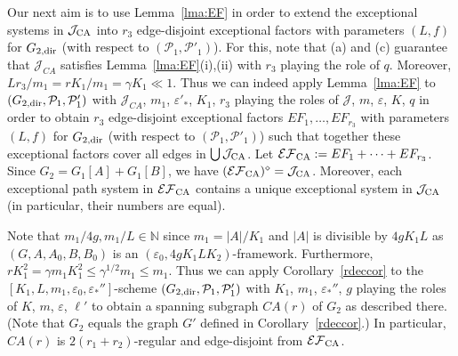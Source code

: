 \documentclass{memo-l}
\def\cP{\mathcal{P}}
\def\eps{\varepsilon}
\def\cJ{\mathcal{J}}
\def\epszero{\eps_0}
\numberwithin{section}{chapter}
\numberwithin{equation}{section}
\numberwithin{firstthm}{section}
\numberwithin{figure}{section}
\begin{document}
{Our next aim is to use Lemma~\ref{lma:EF} in order to extend the exceptional systems in $\mathcal{J}_{\rm CA}$ into $r_3$
edge-disjoint exceptional factors with parameters $(L,f)$ for $G_{2,{\rm dir}}$ (with respect to $(\cP_1,\cP'_1)$).
For this, note that (a) and (c) guarantee that $\cJ_{CA}$ satisfies Lemma~\ref{lma:EF}(i),(ii) with $r_3$ playing the role of $q$. 
Moreover, $Lr_3/m_1= rK_1/m_1=\gamma K_1\ll 1$. 
Thus we can indeed apply Lemma~\ref{lma:EF} to $(G_{2,{\rm dir}}, \mathcal{P}_1,\cP'_1)$
with $\cJ_{CA}$, $m_1$, $\eps'_*$, $K_1$, $r_3$ playing the roles of $\cJ$, $m$, $\eps$, $K$, $q$ in order to obtain $r_3$
edge-disjoint exceptional factors $EF_1,\dots,EF_{r_3}$ with parameters $(L,f)$
for $G_{2,{\rm dir}}$ (with respect to $(\cP_1,\cP'_1)$) such that together these exceptional factors
cover all edges in $\bigcup \mathcal{J}_{\rm CA}$. Let $\mathcal{EF}_{\rm CA}:=EF_1 + \dots + EF_{r_3}$.
Since $G_2 = G_1[A] + G_1[B]$, we have $(\mathcal{EF}_{\rm CA})^{\diamond} = \mathcal{J}_{\rm CA}$.
Moreover, each exceptional path system in $\mathcal{EF}_{\rm CA}$ contains a unique exceptional system in $\mathcal{J}_{\rm CA}$ (in particular, their numbers are equal).

Note that $m_1/4g,m_1/L\in\mathbb{N}$ since $m_1=|A|/K_1$ and $|A|$ is divisible by $4gK_1L$ as $(G,A,A_0,B,B_0)$
is an $(\eps_0, 4gK_1LK_2)$-framework. Furthermore, $rK_1^2=\gamma m_1K_1^2\le \gamma^{1/2}m_1\le m_1$.
Thus we can apply Corollary~\ref{rdeccor} to the $[K_1, L, m_1, \epszero, \eps_*'']$-scheme
$(G_{2,{\rm dir}}, \mathcal{P}_1,\cP'_1)$ with $K_1$, $m_1$, $\eps_*''$, $g$ playing the roles of $K$, $m$, $\eps$, $\ell'$ to obtain a spanning
subgraph $CA(r)$ of $G_2$ as described there. (Note that $G_2$ equals the graph $G'$ defined in Corollary~\ref{rdeccor}.)
In particular, $CA(r)$ is $2(r_1+r_2)$-regular and edge-disjoint from $\mathcal{EF}_{\rm CA}$.

}
\end{document}

